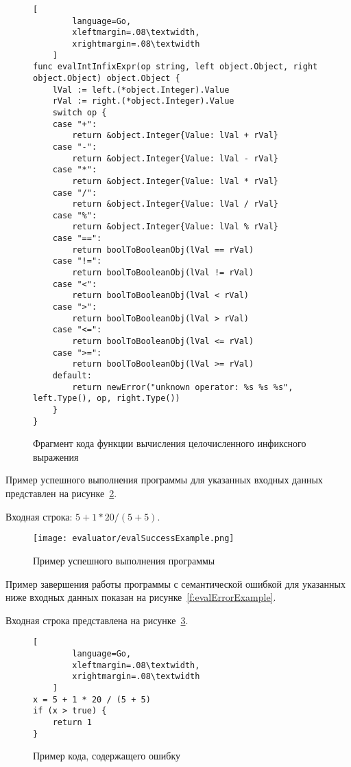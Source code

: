 \begin{figure}[!htb]
	\centering
	\begin{lstlisting}[
        language=Go,
        xleftmargin=.08\textwidth,
        xrightmargin=.08\textwidth
    ]
func evalIntInfixExpr(op string, left object.Object, right object.Object) object.Object {
    lVal := left.(*object.Integer).Value
    rVal := right.(*object.Integer).Value
    switch op {
    case "+":
        return &object.Integer{Value: lVal + rVal}
    case "-":
        return &object.Integer{Value: lVal - rVal}
    case "*":
        return &object.Integer{Value: lVal * rVal}
    case "/":
        return &object.Integer{Value: lVal / rVal}
    case "%":
        return &object.Integer{Value: lVal % rVal}
    case "==":
        return boolToBooleanObj(lVal == rVal)
    case "!=":
        return boolToBooleanObj(lVal != rVal)
    case "<":
        return boolToBooleanObj(lVal < rVal)
    case ">":
        return boolToBooleanObj(lVal > rVal)
    case "<=":
        return boolToBooleanObj(lVal <= rVal)
    case ">=":
        return boolToBooleanObj(lVal >= rVal)
    default:
        return newError("unknown operator: %s %s %s", left.Type(), op, right.Type())
    }
}
\end{lstlisting}
	\caption{Фрагмент кода функции вычисления целочисленного инфиксного выражения}
	\label{f:code_evalIntInfixExpr}
\end{figure}


Пример успешного выполнения программы для указанных входных данных представлен на рисунке~\ref{f:evalSuccessExample}.

Входная строка: $5 + 1 * 20 / (5 + 5)$.

\clearpage

\begin{figure}[!htb]
	\centering
	\texttt{[image: evaluator/evalSuccessExample.png]}
	\caption{Пример успешного выполнения программы}
	\label{f:evalSuccessExample}
\end{figure}

Пример завершения работы программы с семантической ошибкой для указанных ниже входных данных показан на рисунке~\ref{f:evalErrorExample}.

Входная строка представлена на рисунке~\ref{f:code_evalErrorExample}.

\begin{figure}[!htb]
	\centering
    \vspace{\toppaddingoffigure}
	\begin{lstlisting}[
        language=Go,
        xleftmargin=.08\textwidth,
        xrightmargin=.08\textwidth
    ]
x = 5 + 1 * 20 / (5 + 5)
if (x > true) {
    return 1
}    
\end{lstlisting}
	\caption{Пример кода, содержащего ошибку}
	\label{f:code_evalErrorExample}
\end{figure}

